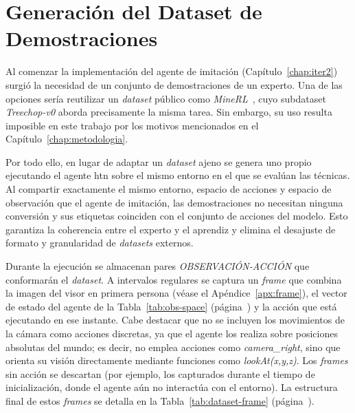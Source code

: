 \section{Generación del Dataset de Demostraciones}
\label{sec:dataset-htn}
Al comenzar la implementación del agente de imitación (Capítulo~\ref{chap:iter2})
surgió la necesidad de un conjunto de demostraciones de un experto. Una de las opciones
sería reutilizar un \textit{dataset} público como \textit{MineRL}~\cite{guss2019minerl},
cuyo subdataset \textit{Treechop-v0} aborda precisamente la misma tarea. Sin
embargo, su uso resulta imposible en este trabajo por los motivos mencionados en el 
Capítulo~\ref{chap:metodologia}.

Por todo ello, en lugar de adaptar un \textit{dataset} ajeno se genera uno propio
ejecutando el agente \gls{htn} sobre el mismo entorno en el que se evalúan las técnicas.
Al compartir exactamente el mismo entorno, espacio de acciones y espacio de observación
que el agente de imitación, las demostraciones no necesitan ninguna conversión y
sus etiquetas coinciden con el conjunto de acciones del modelo. Esto
garantiza la coherencia entre el experto y el aprendiz y elimina el desajuste de
formato y granularidad de \textit{datasets} externos.

Durante la ejecución se almacenan pares
\textit{OBSERVACIÓN-ACCIÓN} que conformarán el \textit{dataset}. A intervalos regulares se captura un \textit{frame} 
que combina la imagen del visor en primera persona (véase el Apéndice~\ref{apx:frame}), el vector de estado del agente
de la Tabla~\ref{tab:obs-space} (página~\pageref{tab:obs-space}) y la acción que está ejecutando en ese
instante. Cabe destacar que no se incluyen los movimientos de la cámara como acciones discretas, ya que el agente 
los realiza sobre posiciones absolutas del mundo; es decir, no emplea acciones como \textit{camera\_right}, 
sino que orienta su visión directamente mediante funciones como \textit{lookAt(x,y,z)}.
Los \textit{frames} sin acción se descartan (por ejemplo, los capturados durante el tiempo de inicialización, 
donde el agente aún no interactúa con el entorno).
La estructura final de estos \textit{frames} se detalla en la Tabla~\ref{tab:dataset-frame} (página~\pageref{tab:dataset-frame}).

